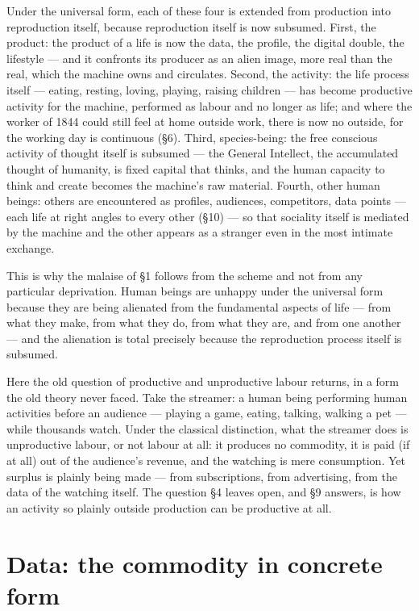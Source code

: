 \documentclass[11pt]{article}
\begin{document}
Under the universal form, each of these four is extended from production
into reproduction itself, because reproduction itself is now subsumed.
First, the product: the product of a life is now the data, the profile,
the digital double, the lifestyle --- and it confronts its producer as
an alien image, more real than the real, which the machine owns and
circulates. Second, the activity: the life process itself --- eating,
resting, loving, playing, raising children --- has become productive
activity for the machine, performed as labour and no longer as life; and
where the worker of 1844 could still feel at home outside work, there is
now no outside, for the working day is continuous (§6). Third,
species-being: the free conscious activity of thought itself is subsumed
--- the General Intellect, the accumulated thought of humanity, is fixed
capital that thinks, and the human capacity to think and create becomes
the machine's raw material. Fourth, other human beings: others are
encountered as profiles, audiences, competitors, data points --- each
life at right angles to every other (§10) --- so that sociality itself is
mediated by the machine and the other appears as a stranger even in the
most intimate exchange.

This is why the malaise of §1 follows from the scheme and not from any
particular deprivation. Human beings are unhappy under the universal form
because they are being alienated from the fundamental aspects of life ---
from what they make, from what they do, from what they are, and from one
another --- and the alienation is total precisely because the
reproduction process itself is subsumed.

Here the old question of productive and unproductive labour returns, in
a form the old theory never faced. Take the streamer: a human being
performing human activities before an audience --- playing a game,
eating, talking, walking a pet --- while thousands watch. Under the
classical distinction, what the streamer does is unproductive labour, or
not labour at all: it produces no commodity, it is paid (if at all) out
of the audience's revenue, and the watching is mere consumption. Yet
surplus is plainly being made --- from subscriptions, from advertising,
from the data of the watching itself. The question §4 leaves open, and
§9 answers, is how an activity so plainly outside production can be
productive at all.

\section{Data: the commodity in concrete form}
\end{document}
